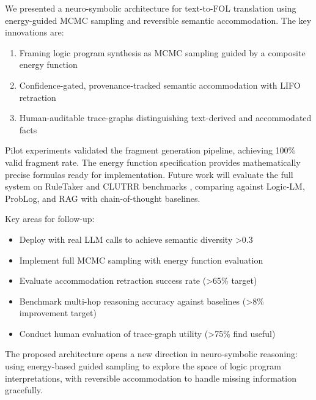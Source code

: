 \documentclass[11pt,letterpaper]{article}
\begin{document}
We presented a neuro-symbolic architecture for text-to-FOL translation using energy-guided MCMC sampling and reversible semantic accommodation. The key innovations are:

\begin{enumerate}
  \item Framing logic program synthesis as MCMC sampling guided by a composite energy function
  \item Confidence-gated, provenance-tracked semantic accommodation with LIFO retraction
  \item Human-auditable trace-graphs distinguishing text-derived and accommodated facts
\end{enumerate}

Pilot experiments validated the fragment generation pipeline, achieving 100\% valid fragment rate. The energy function specification provides mathematically precise formulas ready for implementation. Future work will evaluate the full system on RuleTaker and CLUTRR benchmarks \cite{Sinha2019}, comparing against Logic-LM, ProbLog, and RAG with chain-of-thought baselines.

Key areas for follow-up:
\begin{itemize}
  \item Deploy with real LLM calls to achieve semantic diversity >0.3
  \item Implement full MCMC sampling with energy function evaluation
  \item Evaluate accommodation retraction success rate (>65\% target)
  \item Benchmark multi-hop reasoning accuracy against baselines (>8\% improvement target)
  \item Conduct human evaluation of trace-graph utility (>75\% find useful)
\end{itemize}

The proposed architecture opens a new direction in neuro-symbolic reasoning: using energy-based guided sampling to explore the space of logic program interpretations, with reversible accommodation to handle missing information gracefully.



\end{document}
